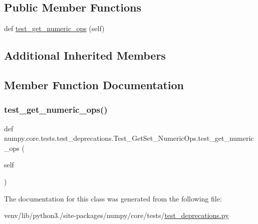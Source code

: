 \subsection*{Public Member Functions}
\begin{DoxyCompactItemize}
\item 
def \hyperlink{classnumpy_1_1core_1_1tests_1_1test__deprecations_1_1Test__GetSet__NumericOps_a57a0fb652aab953a19886a8bf2cf8b8f}{test\+\_\+get\+\_\+numeric\+\_\+ops} (self)
\end{DoxyCompactItemize}
\subsection*{Additional Inherited Members}


\subsection{Member Function Documentation}
\mbox{\label{classnumpy_1_1core_1_1tests_1_1test__deprecations_1_1Test__GetSet__NumericOps_a57a0fb652aab953a19886a8bf2cf8b8f}} 
\subsubsection{\texorpdfstring{test\+\_\+get\+\_\+numeric\+\_\+ops()}{test\_get\_numeric\_ops()}}
{\footnotesize\ttfamily def numpy.\+core.\+tests.\+test\+\_\+deprecations.\+Test\+\_\+\+Get\+Set\+\_\+\+Numeric\+Ops.\+test\+\_\+get\+\_\+numeric\+\_\+ops (\begin{DoxyParamCaption}\item[{}]{self }\end{DoxyParamCaption})}



The documentation for this class was generated from the following file\+:\begin{DoxyCompactItemize}
\item 
venv/lib/python3./site-\/packages/numpy/core/tests/\hyperlink{core_2tests_2test__deprecations_8py}{test\+\_\+deprecations.\+py}\end{DoxyCompactItemize}
